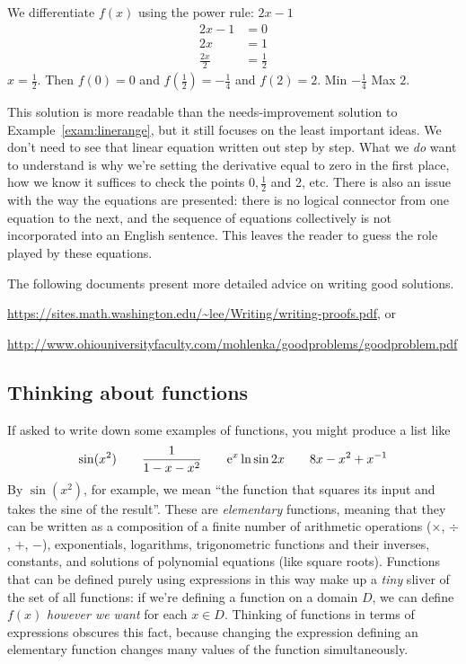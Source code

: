 \documentclass{watsonbook}
\begin{document}
\begin{solution}[title=Solution that needs improvement] 
  We differentiate $f(x)$ using the power rule: $2x-1$
  \begin{align*}
    2x - 1 &= 0 \\
    2x &= 1  \\
    \frac{2x}{2} &= \frac{1}{2}
  \end{align*}
  $x = \tfrac{1}{2}$. Then $f(0) = 0$ and $f(\tfrac{1}{2}) =
  -\tfrac{1}{4}$ and $f(2) = 2$. Min $-\tfrac{1}{4}$ Max $2$. 
\end{solution}

This solution is more readable than the needs-improvement solution to
Example~\ref{exam:linerange}, but it still focuses on the least
important ideas.  We don't need to see that linear equation written
out step by step. What we \textit{do} want to understand is why we're
setting the derivative equal to zero in the first place, how we know
it suffices to check the points $0, \tfrac{1}{2}$ and 2, etc. There is
also an issue with the way the equations are presented: there is no
logical connector from one equation to the next, and the sequence of
equations collectively is not incorporated into an English
sentence. This leaves the reader to guess the role played by these
equations.

The following documents present more detailed advice on writing good
solutions.
\begin{center}
  \url{https://sites.math.washington.edu/~lee/Writing/writing-proofs.pdf},
  or 

  \url{http://www.ohiouniversityfaculty.com/mohlenka/goodproblems/goodproblem.pdf}
\end{center}

\subsection{Thinking about functions} \label{sec:whatisafunction}

If asked to write down some examples of functions, you might produce a
list like
\[
  \sin(x^2) \qquad \frac{1}{1-x-x^2} \qquad \mathrm{e}^{x}\ln \sin 2x \qquad
  8x - x^2 + x^{-1}
\]
By $\sin(x^2)$, for example, we mean ``the function that squares its
input and takes the sine of the result''. These are
\textit{elementary} functions, meaning that they can be written as a
composition of a finite number of arithmetic operations ($\times$,
$\div$, $+$, $-$), exponentials, logarithms, trigonometric functions
and their inverses, constants, and solutions of polynomial equations
(like square roots). Functions that can be defined purely using
expressions in this way make up a \textit{tiny} sliver of the set of
all functions: if we're defining a function on a domain $D$, we can
define $f(x)$ \textit{however we want} for each $x\in D$. Thinking of
functions in terms of expressions obscures this fact, because changing
the expression defining an elementary function changes many values of
the function simultaneously.
\end{document}
